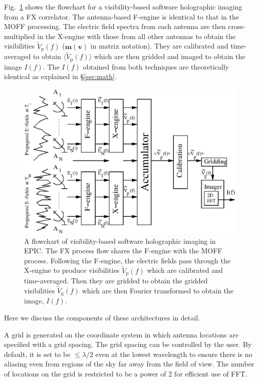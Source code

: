 \documentclass[a4paper,fleqn,usenatbib]{mnras}
\begin{document}
Fig.~\ref{fig:FX-flowchart} shows the flowchart for a visibility-based software 
holographic imaging from a FX correlator. The antenna-based F-engine is identical 
to that in the MOFF processing. The electric field spectra from each antenna are 
then cross-multiplied in the X-engine with those from all other antennas to 
obtain the visibilities $\widetilde{V}_\textrm{p}(f)$ ($\mathbf{m}(\mathbf{v})$ 
in matrix notation). They are calibrated and time-averaged to obtain 
$\langle \widetilde{V}_\textrm{p}(f)\rangle$ which are then gridded and imaged to 
obtain the image $I(f)$. The $I(f)$ obtained from both techniques are 
theoretically identical as explained in \S\ref{sec:math}.
\begin{figure}
  \includegraphics[width=\columnwidth]{figure2}
  \caption{A flowchart of visibility-based software holographic imaging in EPIC. 
    The FX process flow shares the F-engine with the MOFF process. Following the 
    F-engine, the electric fields pass through the X-engine to produce 
    visibilities $\widetilde{V}_\textrm{p}(f)$ which are calibrated and 
    time-averaged. Then they are gridded to obtain the gridded visibilities 
    $\widetilde{V}_\textrm{g}(f)$ which are then Fourier transformed to obtain 
    the image, $I(f)$.}
  \label{fig:FX-flowchart}
\end{figure}

Here we discuss the components of these architectures in detail. 

\par\medskip
{}
\par\medskip
\noindent A grid is generated on the coordinate system in which antenna 
locations are specified with a grid spacing. The grid spacing can be controlled 
by the user. By default, it is set to be $\le\lambda/2$ even at the 
lowest wavelength to ensure there is no aliasing even from regions of the sky 
far away from the field of view. The number of locations on the grid is 
restricted to be a power of 2 for efficient use of FFT. 
\end{document}
